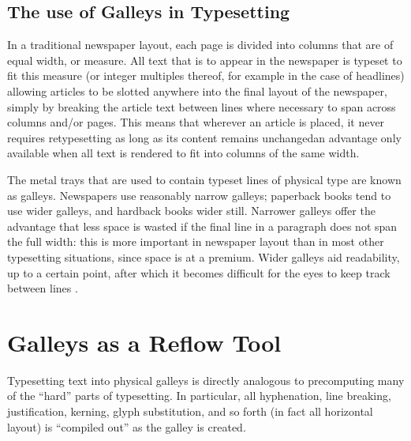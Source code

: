 \subsection{The use of Galleys in Typesetting}
\label{sec:galleys}
In a traditional newspaper layout, each page is divided into columns that are of equal width, or \gls{measure}. All text that is to appear in the newspaper is typeset to fit this measure (or integer multiples thereof, for example in the case of headlines) allowing articles to be slotted anywhere into the final layout of the newspaper, simply by breaking the article text between lines where necessary to span across columns and/or pages. This means that wherever an article is placed, it never requires retypesetting as long as its content remains unchanged\ed{}an advantage only available when all text is rendered to fit into columns of the same width.


The metal trays that are used to contain typeset lines of physical type are known as \glspl{galley}. Newspapers  use reasonably narrow galleys; paperback books tend to use wider galleys, and hardback books wider still. Narrower galleys offer the advantage that less space is wasted if the final line in a paragraph does not span the full width: this is more important in newspaper layout than in most other typesetting situations, since space is at a premium. Wider galleys aid readability, up to a certain point, after which it becomes difficult for the eyes to keep track between lines \cite{Bringhurst2008, Braganza2009, Voorhees2011}.



\section{Galleys as a Reflow Tool}
\label{sec:singlegalleymetric}
Typesetting text into physical galleys is directly analogous to precomputing many of the ``hard'' parts of typesetting. In particular, all hyphenation, line breaking, \gls{justification}, \gls{kerning}, \gls{glyph} substitution, and so forth (in fact all horizontal layout) is ``compiled out'' as the galley is created.

